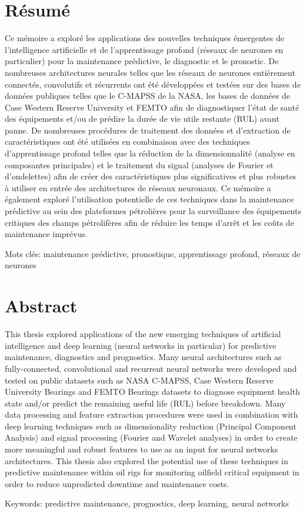 \chapter*{Résumé}
\vspace{-2cm}
Ce mémoire a exploré les applications des nouvelles techniques émergentes de l'intelligence artificielle et de l'apprentissage profond (réseaux de neurones en particulier) pour la maintenance prédictive, le diagnostic et le pronostic. De nombreuses architectures neurales telles que les réseaux de neurones entièrement connectés, convolutifs et récurrents ont été développées et testées sur des bases de données publiques telles que le C-MAPSS de la NASA, les bases de données de Case Western Reserve University et FEMTO afin de diagnostiquer l'état de santé des équipements et/ou de prédire la durée de vie utile restante (RUL) avant panne. De nombreuses procédures de traitement des données et d'extraction de caractéristiques ont été utilisées en combinaison avec des techniques d'apprentissage profond telles que la réduction de la dimensionnalité (analyse en composantes principales) et le traitement du signal (analyses de Fourier et d'ondelettes) afin de créer des caractéristiques plus significatives et plus robustes à utiliser en entrée des architectures de réseaux neuronaux. Ce mémoire a également exploré l'utilisation potentielle de ces techniques dans la maintenance prédictive au sein des plateformes pétrolières pour la surveillance des équipements critiques des champs pétrolifères afin de réduire les temps d'arrêt et les coûts de maintenance imprévus.

Mots clés: maintenance prédictive, pronostique, apprentissage profond, réseaux de neurones

\vspace{-1cm}
{\let\clearpage\relax\chapter*{Abstract}}
\vspace{-2.5cm}
This thesis explored applications of the new emerging techniques of artificial intelligence and deep learning (neural networks in particular) for predictive maintenance, diagnostics and prognostics. Many neural architectures such as fully-connected, convolutional and recurrent neural networks were developed and tested on public datasets such as NASA C-MAPSS, Case Western Reserve University Bearings and FEMTO Bearings datasets to diagnose equipment health state and/or predict the remaining useful life (RUL) before breakdown. Many data processing and feature extraction procedures were used in combination with deep learning techniques such as dimensionality reduction (Principal Component Analysis) and signal processing (Fourier and Wavelet analyses) in order to create more meaningful and robust features to use as an input for neural networks architectures. This thesis also explored the potential use of these techniques in predictive maintenance within oil rigs for monitoring oilfield critical equipment in order to reduce unpredicted downtime and maintenance costs.


Keywords: predictive maintenance, prognostics, deep learning, neural networks
